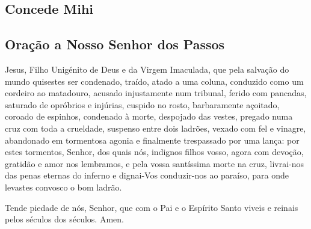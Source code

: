 \subsection{Concede Mihi}
\begin{paracol}{2}\switchcolumn{}\switchcolumn*{}\switchcolumn{}\switchcolumn*{}\switchcolumn{}\switchcolumn*{}\switchcolumn{}\end{paracol}

\subsection{Oração a Nosso Senhor dos Passos}
 Jesus, Filho Unigénito de Deus e da Virgem Imaculada, que pela salvação do mundo quisestes ser condenado, traído, atado a uma coluna, conduzido como um cordeiro ao matadouro, acusado injustamente num tribunal, ferido com pancadas, saturado de opróbrios e injúrias, cuspido no rosto, barbaramente açoitado, coroado de espinhos, condenado à morte, despojado das vestes, pregado numa cruz com toda a crueldade, suspenso entre dois ladrões, vexado com fel e vinagre, abandonado em tormentosa agonia e finalmente trespassado por uma lança: por estes tormentos, Senhor, dos quais nós, indignos filhos vosso, agora com devoção, gratidão e amor nos lembramos, e pela vossa santíssima morte na cruz, livrai-nos das penas eternas do inferno e dignai-Vos conduzir-nos ao paraíso, para onde levastes convosco o bom ladrão.\par
Tende piedade de nós, Senhor, que com o Pai e o Espírito Santo viveis e reinais pelos séculos dos séculos. Amen.

